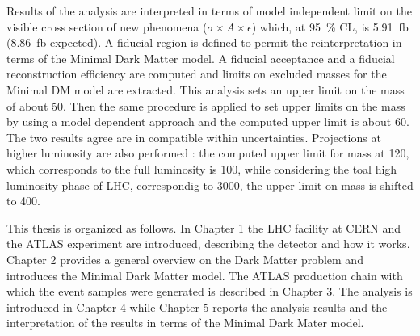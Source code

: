 Results of the \mph analysis are interpreted in terms of model independent limit on the visible cross section of new phenomena ($\sigma\times A\times\epsilon$) which, at \SI{95}{\percent} CL, is \SI{5.91}{fb} (\SI{8.86}{fb} expected). A fiducial region is defined to permit the reinterpretation in terms of the Minimal Dark Matter model. A fiducial acceptance and a fiducial reconstruction efficiency are computed and limits on excluded masses for the Minimal DM model are extracted. This analysis sets an upper limit on the \chizero mass of about \SI{50}{\gev}.
Then the same procedure is applied to set upper limits on the \chizero mass by using a model dependent approach and the computed upper limit is about \SI{60}{\gev}. The two results agree are in compatible within uncertainties.
Projections at higher luminosity are also performed : the computed upper limit for \chizero mass at \SI{120}{\ifb}, which corresponds to the full \RunTwo luminosity is \SI{100}{\gev}, while considering the toal high luminosity phase of LHC, correspondig to \SI{3000}{\ifb}, the upper limit on \chizero mass is shifted to \SI{400}{\gev}.

\bigskip
  
This thesis is organized as follows. In Chapter 1 the LHC facility at CERN and the ATLAS experiment are introduced, describing the detector and how it works. Chapter 2 provides a general overview on the Dark Matter problem and introduces the Minimal Dark Matter model. The ATLAS production chain with which the event samples were generated is described in Chapter 3. The \mph analysis is introduced in Chapter 4 while Chapter 5 reports the analysis results and the interpretation of the \mph results in terms of the Minimal Dark Mater model.



